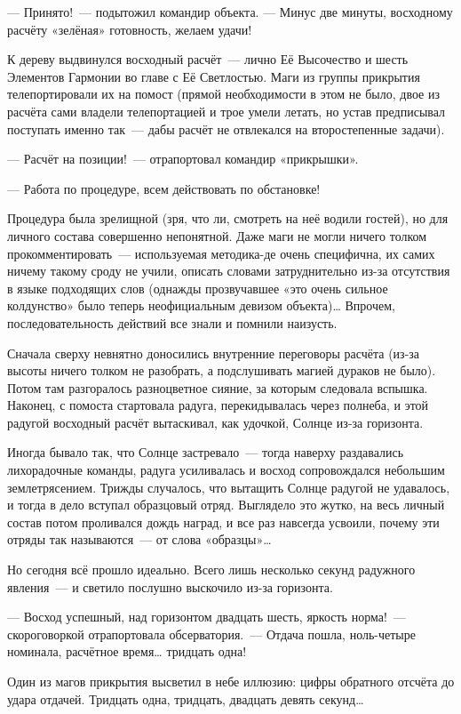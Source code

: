 \documentclass[twoside,a5paper,12pt]{extbook}
\begin{document}
— Принято! — подытожил командир объекта. — Минус две минуты, восходному расчёту «зелёная» готовность, желаем удачи!

К дереву выдвинулся восходный расчёт — лично Её Высочество и шесть Элементов Гармонии во главе с Её Светлостью. Маги из группы прикрытия телепортировали их на помост (прямой необходимости в этом не было, двое из расчёта сами владели телепортацией и трое умели летать, но устав предписывал поступать именно так — дабы расчёт не отвлекался на второстепенные задачи).

— Расчёт на позиции! — отрапортовал командир «прикрышки».

— Работа по процедуре, всем действовать по обстановке!

Процедура была зрелищной (зря, что ли, смотреть на неё водили гостей), но для личного состава совершенно непонятной. Даже маги не могли ничего толком прокомментировать — используемая методика-де очень специфична, их самих ничему такому сроду не учили, описать словами затруднительно из-за отсутствия в языке подходящих слов (однажды прозвучавшее «это очень сильное колдунство» было теперь неофициальным девизом объекта)… Впрочем, последовательность действий все знали и помнили наизусть.

Сначала сверху невнятно доносились внутренние переговоры расчёта (из-за высоты ничего толком не разобрать, а подслушивать магией дураков не было). Потом там разгоралось разноцветное сияние, за которым следовала вспышка. Наконец, с помоста стартовала радуга, перекидывалась через полнеба, и этой радугой восходный расчёт вытаскивал, как удочкой, Солнце из-за горизонта.

Иногда бывало так, что Солнце застревало — тогда наверху раздавались лихорадочные команды, радуга усиливалась и восход сопровождался небольшим землетрясением. Трижды случалось, что вытащить Солнце радугой не удавалось, и тогда в дело вступал образцовый отряд. Выглядело это жутко, на весь личный состав потом проливался дождь наград, и все раз навсегда усвоили, почему эти отряды так называются — от слова «образцы»…

Но сегодня всё прошло идеально. Всего лишь несколько секунд радужного явления — и светило послушно выскочило из-за горизонта.

— Восход успешный, над горизонтом двадцать шесть, яркость норма! — скороговоркой отрапортовала обсерватория. — Отдача пошла, ноль-четыре номинала, расчётное время… тридцать одна!

Один из магов прикрытия высветил в небе иллюзию: цифры обратного отсчёта до удара отдачей. Тридцать одна, тридцать, двадцать девять секунд…
\end{document}
